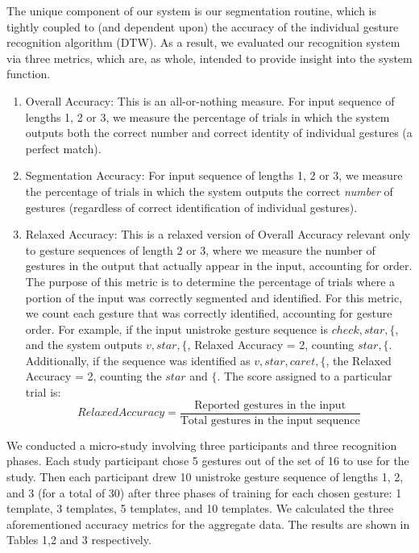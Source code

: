 \documentclass[twoside]{article}
\begin{document}
\begin{multicols}{2}
The unique component of our system is our segmentation routine, which is
tightly coupled to (and dependent upon) the accuracy of the individual gesture
recognition algorithm (DTW). As a result, we evaluated our recognition system via three
metrics, which are, as whole, intended to provide insight into the system function.

\begin{enumerate}
\item Overall Accuracy: This is an all-or-nothing measure. For input sequence of
lengths 1, 2 or 3, we measure the percentage of trials in which the system
outputs both the correct number and correct identity of individual gestures (a perfect match).

\item
Segmentation Accuracy: For input sequence of lengths 1, 2 or 3, we measure the
percentage of trials in which the system outputs the correct \emph{number} of
gestures (regardless of correct identification of individual gestures).

\item Relaxed Accuracy: This is a relaxed version of Overall Accuracy relevant
only to gesture sequences of length 2 or 3, where we measure the number of
gestures in the output that actually appear in the input, accounting for order.
The purpose of this metric is to determine the percentage of trials where a
portion of the input was correctly segmented and identified.
For this metric, we count each gesture that was correctly identified, accounting
for gesture order. For example, if the input unistroke gesture sequence is
$check, star, \{$, and the system outputs $v, star, \{$, Relaxed Accuracy = 2, counting $star, \{$. Additionally, if
the sequence was identified as $v, star, caret, \{$, the Relaxed Accuracy = 2,
counting the $star$ and $\{$. The score assigned to a particular trial is:
\[
		Relaxed Accuracy = \frac{\text{Reported gestures in the input}}{\text{Total gestures in the input sequence}}
	\]
\end{enumerate}

We conducted a micro-study involving three participants and three recognition
phases. Each study participant chose 5 gestures out of the set of 16 to use for
the study. Then each participant drew 10 unistroke gesture sequence of lengths
1, 2, and 3 (for a total of 30) after three phases of training for each chosen gesture: 1 template, 3
templates, 5 templates, and 10 templates. We calculated the three aforementioned accuracy metrics for
the aggregate data. The results are shown in Tables 1,2 and 3 respectively.


\end{multicols}
\end{document}
